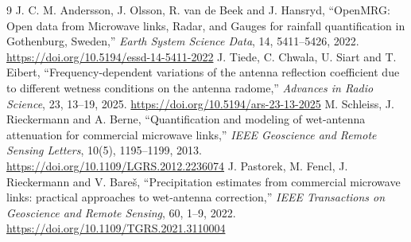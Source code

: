 \documentclass[11pt,a4paper]{article}
\begin{document}
\begin{thebibliography}{9}
 J. C. M. Andersson, J. Olsson, R. van de Beek and J. Hansryd, ``OpenMRG: Open data from Microwave links,
Radar, and Gauges for rainfall quantification in Gothenburg, Sweden,'' \emph{Earth System Science Data}, 14, 5411--5426, 2022.
\url{https://doi.org/10.5194/essd-14-5411-2022}
 J. Tiede, C. Chwala, U. Siart and T. Eibert, ``Frequency-dependent variations of the antenna reflection
coefficient due to different wetness conditions on the antenna radome,'' \emph{Advances in Radio Science}, 23, 13--19, 2025.
\url{https://doi.org/10.5194/ars-23-13-2025}
 M. Schleiss, J. Rieckermann and A. Berne, ``Quantification and modeling of wet-antenna attenuation for
commercial microwave links,'' \emph{IEEE Geoscience and Remote Sensing Letters}, 10(5), 1195--1199, 2013.
\url{https://doi.org/10.1109/LGRS.2012.2236074}
 J. Pastorek, M. Fencl, J. Rieckermann and V. Bare\v{s}, ``Precipitation estimates from commercial microwave
links: practical approaches to wet-antenna correction,'' \emph{IEEE Transactions on Geoscience and Remote Sensing}, 60, 1--9,
2022. \url{https://doi.org/10.1109/TGRS.2021.3110004}
\end{thebibliography}
\end{document}
